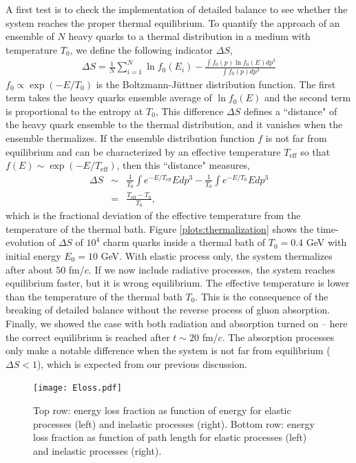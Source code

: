 \documentclass[aps, prc, reprint, amsmath, groupedaddress, nofootinbib]{revtex4-1}
\begin{document}
A first test is to check the implementation of detailed balance to see whether the system reaches the proper thermal equilibrium.
To quantify the approach of an ensemble of $N$ heavy quarks to a thermal distribution in a medium with temperature $T_0$, we define the following indicator $\Delta S$,
\begin{eqnarray}
\Delta S = \frac{1}{N}\sum_{i=1}^{N} \ln f_0(E_i) - \frac{\int f_0(p)\ln f_0(E) dp^3}{\int f_0(p) dp^3}
\end{eqnarray}
$f_0 \propto \exp(-E/T_0)$ is the Boltzmann-J\"uttner distribution function. 
The first term takes the heavy quarks ensemble average of $\ln f_0(E)$ and the second term is proportional to the entropy at $T_0$,
This difference $\Delta S$ defines a ``distance" of the heavy quark ensemble to the thermal distribution, and it vanishes when the ensemble thermalizes.
If the ensemble distribution function $f$ is not far from equilibrium and can be characterized by an effective temperature $T_{\textrm{eff}}$ so that $f(E)\sim \exp(-E/T_{\textrm{eff}})$, then this ``distance" measures,
\begin{eqnarray}
\nonumber
\Delta S &\sim& \frac{1}{T_0}\int  e^{-E/T_{\textrm{eff}}} E dp^3 - \frac{1}{T_0}\int e^{-E/T_0} E dp^3 \\
&=& \frac{T_\textrm{eff}-T_0}{T_0},
\end{eqnarray}
which is the fractional deviation of the effective temperature from the temperature of the thermal bath.
Figure \ref{plots:thermalization} shows the time-evolution of $\Delta S$ of $10^4$ charm quarks inside a thermal bath of $T_0=0.4$ GeV with initial energy $E_0 = 10$ GeV.
With elastic process only, the system thermalizes after about $50$ fm/$c$.
If we now include radiative processes, the system reaches equilibrium faster, but it is wrong equilibrium.
The effective temperature is lower than the temperature of the thermal bath $T_0$.
This is the consequence of the breaking of detailed balance without the reverse process of gluon absorption.
Finally, we showed the case with both radiation and absorption turned on -- here the correct equilibrium is reached after $t\sim 20$ fm/$c$.
The absorption processes only make a notable difference when the system is not far from equilibrium ($\Delta S < 1$), which is expected from our previous discussion.
\begin{figure}
\texttt{[image: Eloss.pdf]}
\caption{Top row: energy loss fraction as function of energy for elastic processes (left) and inelastic processes (right). Bottom row: energy loss fraction as function of path length for elastic processes (left) and inelastic processes (right).}\label{plots:dEE}
\end{figure}
\end{document}
